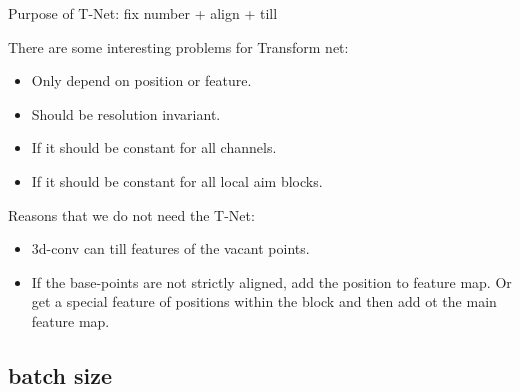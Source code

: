 \documentclass[,table,dvipsnames]{article}
\begin{document}
Purpose of T-Net: fix number + align + till \par
There are some interesting problems for Transform net:
\begin{itemize}
	\item Only depend on position or feature.
	\item Should be resolution invariant.
	\item If it should be constant for all channels.
	\item If it should be constant for all local aim blocks.
\end{itemize}
\par
Reasons that we do not need the T-Net:
\begin{itemize}
	\item 3d-conv can till features of the vacant points.
	\item If the base-points are not strictly aligned, add the position to feature map. Or get a special feature of positions within the block and then add ot the main feature map.
\end{itemize}
\par
{}


\subsection{batch size}
\end{document}
